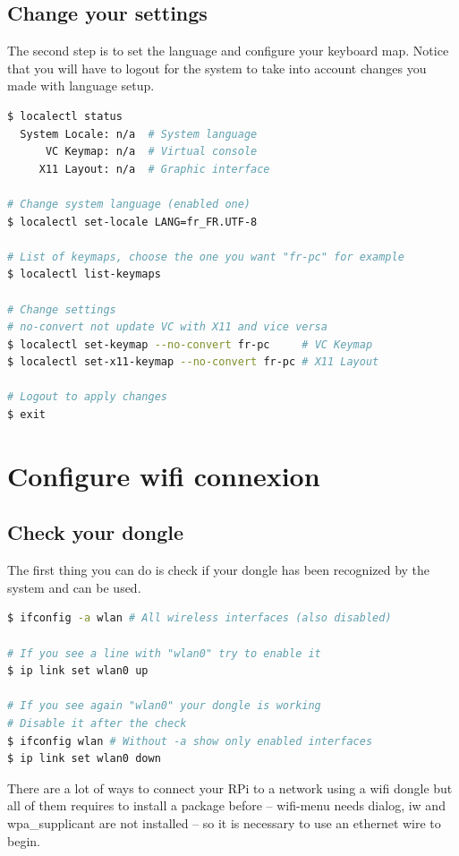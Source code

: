 \subsection{Change your settings}
The second step is to set the language and configure your keyboard map. 
Notice that you will have to logout for the system to take into account 
changes you made with language setup.
\\ 
\begin{lstlisting}[language=bash,caption=Change language settings]
$ localectl status
  System Locale: n/a  # System language
      VC Keymap: n/a  # Virtual console
     X11 Layout: n/a  # Graphic interface
     
# Change system language (enabled one)
$ localectl set-locale LANG=fr_FR.UTF-8

# List of keymaps, choose the one you want "fr-pc" for example
$ localectl list-keymaps

# Change settings 
# no-convert not update VC with X11 and vice versa
$ localectl set-keymap --no-convert fr-pc     # VC Keymap
$ localectl set-x11-keymap --no-convert fr-pc # X11 Layout

# Logout to apply changes
$ exit
\end{lstlisting}

\section{Configure wifi connexion}
\subsection{Check your dongle}
The first thing you can do is check if your dongle has been recognized by 
the system and can be used.

\begin{lstlisting}[language=bash,caption=Check wifi device]
$ ifconfig -a wlan # All wireless interfaces (also disabled)

# If you see a line with "wlan0" try to enable it
$ ip link set wlan0 up

# If you see again "wlan0" your dongle is working
# Disable it after the check
$ ifconfig wlan # Without -a show only enabled interfaces
$ ip link set wlan0 down
\end{lstlisting}

There are a lot of ways to connect your RPi to a network using a wifi dongle 
but all of them requires to install a package before -- wifi-menu needs 
dialog, iw and wpa\_supplicant are not installed -- so it is necessary to 
use an ethernet wire to begin.

